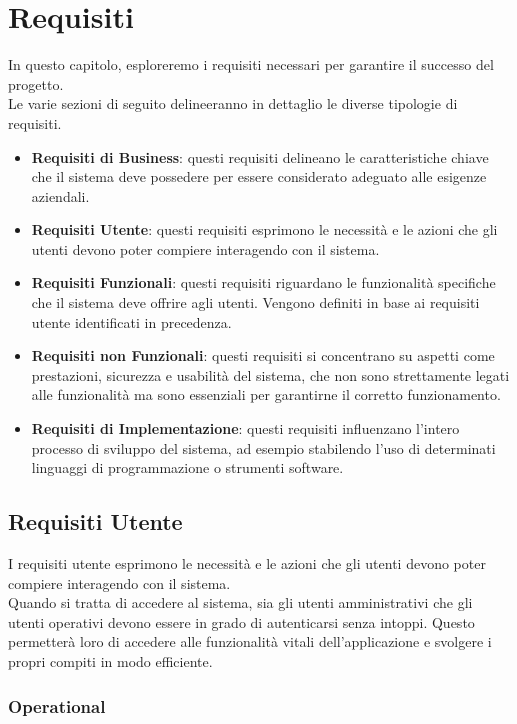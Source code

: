 \section{Requisiti}

In questo capitolo, esploreremo i requisiti necessari per garantire il successo del progetto.\\
Le varie sezioni di seguito delineeranno in dettaglio le diverse tipologie di requisiti.

\begin{itemize}
    \item \textbf{Requisiti di Business}: questi requisiti delineano le caratteristiche chiave che il sistema deve possedere per essere considerato adeguato alle esigenze aziendali.
    \item \textbf{Requisiti Utente}: questi requisiti esprimono le necessità e le azioni che gli utenti devono poter compiere interagendo con il sistema.
    \item \textbf{Requisiti Funzionali}: questi requisiti riguardano le funzionalità specifiche che il sistema deve offrire agli utenti. Vengono definiti in base ai requisiti utente identificati in precedenza.
    \item \textbf{Requisiti non Funzionali}: questi requisiti si concentrano su aspetti come prestazioni, sicurezza e usabilità del sistema, che non sono strettamente legati alle funzionalità ma sono essenziali per garantirne il corretto funzionamento.
    \item \textbf{Requisiti di Implementazione}: questi requisiti influenzano l'intero processo di sviluppo del sistema, ad esempio stabilendo l'uso di determinati linguaggi di programmazione o strumenti software.
\end{itemize}

\subsection{Requisiti Utente}

I requisiti utente esprimono le necessità e le azioni che gli utenti devono
poter compiere interagendo con il sistema.\\
Quando si tratta di accedere al sistema, sia gli utenti amministrativi che gli utenti
operativi devono essere in grado di autenticarsi senza intoppi. Questo permetterà loro di
accedere alle funzionalità vitali dell'applicazione e svolgere i propri compiti in modo efficiente.

\subsubsection{Operational}

